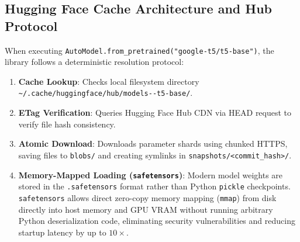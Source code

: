 \documentclass[11pt,a4paper]{article}
\begin{document}
\subsection{Hugging Face Cache Architecture and Hub Protocol}

When executing \texttt{AutoModel.from\_pretrained("google-t5/t5-base")}, the library follows a deterministic resolution protocol:
\begin{enumerate}
    \item \textbf{Cache Lookup}: Checks local filesystem directory \nolinkurl{~/.cache/huggingface/hub/models--t5-base/}.
    \item \textbf{ETag Verification}: Queries Hugging Face Hub CDN via HEAD request to verify file hash consistency.
    \item \textbf{Atomic Download}: Downloads parameter shards using chunked HTTPS, saving files to \texttt{blobs/} and creating symlinks in \texttt{snapshots/<commit\_hash>/}.
    \item \textbf{Memory-Mapped Loading (\texttt{safetensors})}: Modern model weights are stored in the \texttt{.safetensors} format rather than Python \texttt{pickle} checkpoints. \texttt{safetensors} allows direct zero-copy memory mapping (\texttt{mmap}) from disk directly into host memory and GPU VRAM without running arbitrary Python deserialization code, eliminating security vulnerabilities and reducing startup latency by up to $10\times$.
\end{enumerate}
\end{document}
